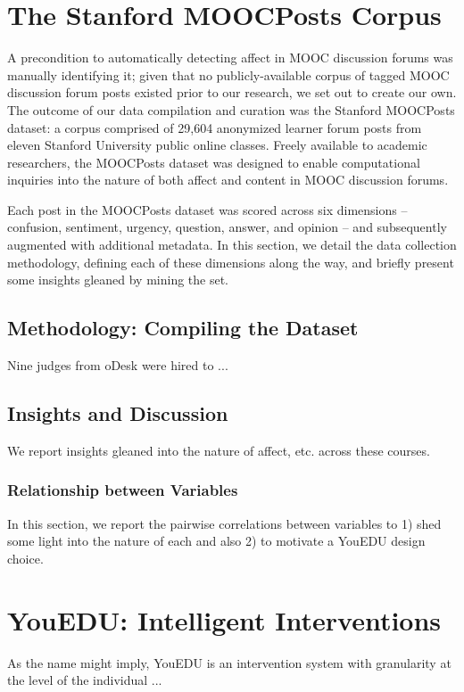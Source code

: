 \documentclass{edm_template}
\begin{document}
\section{The Stanford MOOCPosts Corpus}
A precondition to automatically detecting affect in MOOC discussion forums was manually identifying it; given that no publicly-available corpus of tagged MOOC discussion forum posts existed prior to our research, we set out to create our own. The outcome of our data compilation and curation was the Stanford MOOCPosts dataset: a corpus comprised of 29,604 anonymized learner forum posts from eleven Stanford University public online classes. Freely available to academic researchers, the MOOCPosts dataset was designed to enable computational inquiries into the nature of both affect and content in MOOC discussion forums.

Each post in the MOOCPosts dataset was scored across six dimensions -- confusion, sentiment, urgency, question, answer, and opinion -- and subsequently augmented with additional metadata. In this section, we detail the data collection methodology, defining each of these dimensions along the way, and briefly present some insights gleaned by mining the set.


\subsection{Methodology: Compiling the Dataset}
Nine judges from oDesk were hired to ...

\subsection{Insights and Discussion}
We report insights gleaned into the nature of affect, etc. across these courses.

\subsubsection{Relationship between Variables}
In this section, we report the pairwise correlations between variables to 1) shed some light into the nature of each and also 2) to motivate a YouEDU design choice.

\section{YouEDU: Intelligent Interventions}
As the name might imply, YouEDU is an intervention system with granularity at the level of the individual ...
\end{document}
